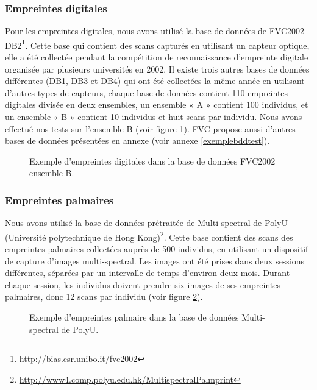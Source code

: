 \subsubsection{Empreintes digitales}
Pour les empreintes digitales, nous avons utilisé la base de données de FVC2002 DB2\footnote{\href{http://bias.csr.unibo.it/fvc2002/databases.asp}{http://bias.csr.unibo.it/fvc2002}}. Cette base qui contient des scans capturés en utilisant un capteur optique, elle a été collectée pendant la compétition de reconnaissance d'empreinte digitale organisée par plusieurs universités en 2002. Il existe trois autres bases de données différentes (DB1, DB3 et DB4) qui ont été collectées la même année en utilisant d'autres types de capteurs, chaque base de données contient 110 empreintes digitales divisée en deux ensembles, un ensemble « A » contient 100 individus, et un ensemble « B » contient 10 individus et huit scans par individu. Nous avons effectué nos tests sur l’ensemble B (voir figure \ref{fig:bdd1}). FVC propose aussi d'autres bases de données présentées en annexe (voir annexe \ref{exemplebddtest}). 
\begin{figure}[H]
	\centering
	\caption{Exemple d’empreintes digitales dans la base de données FVC2002 ensemble B.}
	\label{fig:bdd1}
\end{figure}
\subsubsection{Empreintes palmaires }
Nous avons utilisé la base de données prétraitée de Multi-spectral de PolyU (Université polytechnique de Hong Kong)\footnote{\href{http://www4.comp.polyu.edu.hk/~biometrics/MultispectralPalmprint/MSP.htm}{http://www4.comp.polyu.edu.hk/MultispectralPalmprint}}. Cette base contient des scans des empreintes palmaires collectées auprès de 500 individus, en utilisant un dispositif de capture d’images multi-spectral. Les images ont été prises dans deux sessions différentes, séparées par un intervalle de temps d’environ deux mois. Durant chaque session, les individus doivent prendre six images de ses empreintes palmaires, donc 12 scans par individu (voir figure \ref{fig:bdd2}).
\begin{figure}[H]
	\centering
	\caption{Exemple d’empreintes palmaire dans la base de données Multi-spectral de PolyU.}
	\label{fig:bdd2}
\end{figure}
